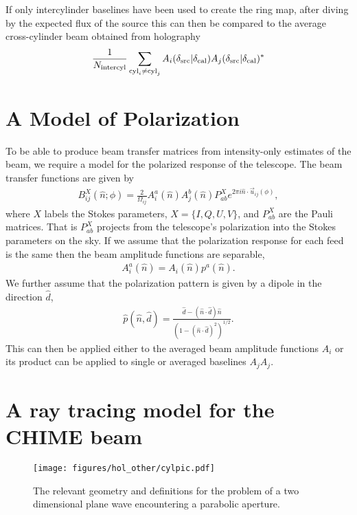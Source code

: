 If only intercylinder baselines have been used to create the ring map, after diving by the expected flux of the source this can then be compared to the average cross-cylinder beam obtained from holography
\begin{equation}
\frac{1}{N_{\rm intercyl}}\sum_{{\rm cyl}_i \ne{\rm cyl}_j}  A_i(\delta_{\rm src} | \delta_{\rm cal})A_j(\delta_{\rm src} | \delta_{\rm cal})^*
\end{equation}

\section{A Model of Polarization}
\label{app:hol:sec:polmodel}

To be able to produce beam transfer matrices from intensity-only estimates of the beam, we require a model for the polarized response of the telescope. The beam transfer functions are given by
\begin{align}
B^X_{ij}(\hat{n}; \phi) = \frac{2}{\Omega_{ij}} A^a_i(\hat{n}) A^b_j(\hat{n}) P_{ab}^X e^{2\pi i \hat{n}\cdot\vec{u}_{ij}(\phi)},
\end{align}
where $X$ labels the Stokes parameters, $X=\{I, Q, U, V\}$, and $P_{ab}^X$ are the Pauli matrices. That is $P_{ab}^X$ projects from the telescope's polarization into the Stokes parameters on the sky. If we assume that the polarization response for each feed is the same then the beam amplitude functions are separable,
\begin{align}
A^a_i(\hat{n}) = A_i(\hat{n})p^a(\hat{n}).
\end{align}
We further assume that the polarization pattern is given by a dipole in the direction $\hat{d}$,
\begin{align}
\hat{p}(\hat{n}, \hat{d}) =\frac{\hat{d} - (\hat{n}\cdot\hat{d}) \hat{n}}{(1 - (\hat{n}\cdot\hat{d})^2)^{1/2}}.
\end{align}
This can then be applied either to the averaged beam amplitude functions $A_i$  or its product can be applied to single or averaged baselines $A_jA_j$.

\section{A ray tracing model for the CHIME beam}
\label{app:hol:sec:model}

\begin{figure}[h!]
\begin{center}
\texttt{[image: figures/hol\_other/cylpic.pdf]}
\caption{The relevant geometry and definitions for the problem of a two dimensional plane wave encountering a parabolic aperture.}
\end{center}
\label{cylpic}
\end{figure}

